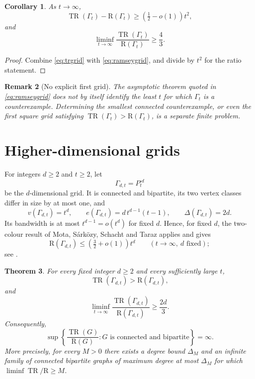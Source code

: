 \documentclass[10pt,a4paper]{amsart}
\newtheorem{theorem}{Theorem}
\newtheorem{corollary}[theorem]{Corollary}
\newtheorem{remark}[theorem]{Remark}
\DeclareMathOperator{\TR}{TR}
\newcommand{\R}{\mathrm{R}}
\begin{document}
\begin{corollary}
As $t \to \infty$,
\[
\TR(\Gamma_t) - \R(\Gamma_t) \geq \left( \tfrac{1}{2} - o(1) \right) t^2,
\]
and
\[
\liminf_{t \to \infty} \frac{\TR(\Gamma_t)}{\R(\Gamma_t)} \geq \frac{4}{3}.
\]
\end{corollary}

\begin{proof}
Combine \eqref{eq:trgrid} with \eqref{eq:ramseygrid}, and divide by $t^2$ for the ratio statement.
\end{proof}

\begin{remark}[No explicit first grid]
The asymptotic theorem quoted in \eqref{eq:ramseygrid} does not by itself identify the least $t$ for which $\Gamma_t$ is a counterexample. Determining the smallest connected counterexample, or even the first square grid satisfying $\TR(\Gamma_t) > \R(\Gamma_t)$, is a separate finite problem.
\end{remark}

\section{Higher-dimensional grids}

For integers $d \geq 2$ and $t \geq 2$, let
\[
\Gamma_{d,t} = P_t^{\square d}
\]
be the $d$-dimensional grid. It is connected and bipartite, its two vertex classes differ in size by at most one, and
\begin{equation}\label{eq:dgrid}
v(\Gamma_{d,t}) = t^d, \qquad e(\Gamma_{d,t}) = d\, t^{d-1}(t-1), \qquad \Delta(\Gamma_{d,t}) = 2d.
\end{equation}
Its bandwidth is at most $t^{d-1} = o(t^d)$ for fixed $d$. Hence, for fixed $d$, the two-colour result of Mota, S\'ark\"ozy, Schacht and Taraz applies and gives
\begin{equation}\label{eq:ramseydgrid}
\R(\Gamma_{d,t}) \leq \left( \tfrac{3}{2} + o(1) \right) t^d \qquad (t \to \infty,\ d \text{ fixed});
\end{equation}
see \cite[Theorem 1.2 and the discussion of higher-dimensional grids]{MSST}.


\begin{theorem}\label{thm:dgrid}
For every fixed integer $d \geq 2$ and every sufficiently large $t$,
\[
\TR(\Gamma_{d,t}) > \R(\Gamma_{d,t}),
\]
and
\[
\liminf_{t \to \infty} \frac{\TR(\Gamma_{d,t})}{\R(\Gamma_{d,t})} \geq \frac{2d}{3}.
\]
Consequently,
\[
\sup \left\{ \frac{\TR(G)}{\R(G)} : G \text{ is connected and bipartite} \right\} = \infty.
\]
More precisely, for every $M > 0$ there exists a degree bound $\Delta_M$ and an infinite family of connected bipartite graphs of maximum degree at most $\Delta_M$ for which $\liminf \TR/\R \geq M$.
\end{theorem}
\end{document}
